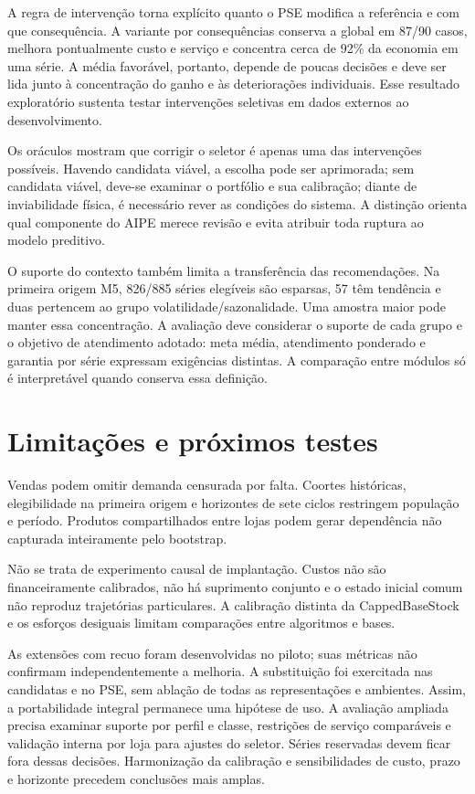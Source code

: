 \documentclass[preprint,12pt]{elsarticle}
\begin{document}
A regra de intervenção torna explícito quanto o PSE modifica a referência e com que consequência. A variante por consequências conserva a global em 87/90 casos, melhora pontualmente custo e serviço e concentra cerca de 92\% da economia em uma série. A média favorável, portanto, depende de poucas decisões e deve ser lida junto à concentração do ganho e às deteriorações individuais. Esse resultado exploratório sustenta testar intervenções seletivas em dados externos ao desenvolvimento.

Os oráculos mostram que corrigir o seletor é apenas uma das intervenções possíveis. Havendo candidata viável, a escolha pode ser aprimorada; sem candidata viável, deve-se examinar o portfólio e sua calibração; diante de inviabilidade física, é necessário rever as condições do sistema. A distinção orienta qual componente do AIPE merece revisão e evita atribuir toda ruptura ao modelo preditivo.

O suporte do contexto também limita a transferência das recomendações. Na primeira origem M5, 826/885 séries elegíveis são esparsas, 57 têm tendência e duas pertencem ao grupo volatilidade/sazonalidade. Uma amostra maior pode manter essa concentração. A avaliação deve considerar o suporte de cada grupo e o objetivo de atendimento adotado: meta média, atendimento ponderado e garantia por série expressam exigências distintas. A comparação entre módulos só é interpretável quando conserva essa definição.

\section{Limitações e próximos testes}
Vendas podem omitir demanda censurada por falta. Coortes históricas, elegibilidade na primeira origem e horizontes de sete ciclos restringem população e período. Produtos compartilhados entre lojas podem gerar dependência não capturada inteiramente pelo bootstrap.

Não se trata de experimento causal de implantação. Custos não são financeiramente calibrados, não há suprimento conjunto e o estado inicial comum não reproduz trajetórias particulares. A calibração distinta da CappedBaseStock e os esforços desiguais limitam comparações entre algoritmos e bases.

As extensões com recuo foram desenvolvidas no piloto; suas métricas não confirmam independentemente a melhoria. A substituição foi exercitada nas candidatas e no PSE, sem ablação de todas as representações e ambientes. Assim, a portabilidade integral permanece uma hipótese de uso. A avaliação ampliada precisa examinar suporte por perfil e classe, restrições de serviço comparáveis e validação interna por loja para ajustes do seletor. Séries reservadas devem ficar fora dessas decisões. Harmonização da calibração e sensibilidades de custo, prazo e horizonte precedem conclusões mais amplas.
\end{document}
